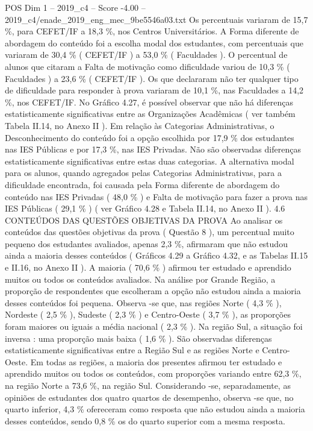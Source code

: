 \begin{textsample}{POS Dim 1 – 2019\_c4 – Score -4.00 – 2019\_c4/enade\_2019\_eng\_mec\_9be5546a03.txt}
Os percentuais variaram de 15,7 \%, para CEFET/IF a 18,3 \%, nos Centros Universitários.
A Forma diferente de abordagem do conteúdo foi a escolha modal dos estudantes, com percentuais que variaram de 30,4 \% ( CEFET/IF ) a 53,0 \% ( Faculdades ).
O percentual de alunos que citaram a Falta de motivação como dificuldade variou de 10,3 \% ( Faculdades ) a 23,6 \% ( CEFET/IF ).
Os que declararam não ter qualquer tipo de dificuldade para responder à prova variaram de 10,1 \%, nas Faculdades a 14,2 \%, nos CEFET/IF.
No Gráfico 4.27, é possível observar que não há diferenças estatisticamente significativas entre as Organizações Acadêmicas ( ver também Tabela II.14, no Anexo II ).
Em relação às Categorias Administrativas, o Desconhecimento do conteúdo foi a opção escolhida por 17,9 \% dos estudantes nas IES Públicas e por 17,3 \%, nas IES Privadas.
Não são observadas diferenças estatisticamente significativas entre estas duas categorias.
A alternativa modal para os alunos, quando agregados pelas Categorias Administrativas, para a dificuldade encontrada, foi causada pela Forma diferente de abordagem do conteúdo nas IES Privadas ( 48,0 \% ) e Falta de motivação para fazer a prova nas IES Públicas ( 29,1 \% ) ( ver Gráfico 4.28 e Tabela II.14, no Anexo II ). 4.6 CONTEÚDOS DAS QUESTÕES OBJETIVAS DA PROVA Ao analisar os conteúdos das questões objetivas da prova ( Questão 8 ), um percentual muito pequeno dos estudantes avaliados, apenas 2,3 \%, afirmaram que não estudou ainda a maioria desses conteúdos ( Gráficos 4.29 a Gráfico 4.32, e as Tabelas II.15 e II.16, no Anexo II ).
A maioria ( 70,6 \% ) afirmou ter estudado e aprendido muitos ou todos os conteúdos avaliados.
Na análise por Grande Região, a proporção de respondentes que escolheram a opção não estudou ainda a maioria desses conteúdos foi pequena.
Observa -se que, nas regiões Norte ( 4,3 \% ), Nordeste ( 2,5 \% ), Sudeste ( 2,3 \% ) e Centro-Oeste ( 3,7 \% ), as proporções foram maiores ou iguais a média nacional ( 2,3 \% ).
Na região Sul, a situação foi inversa : uma proporção mais baixa ( 1,6 \% ).
São observadas diferenças estatisticamente significativas entre a Região Sul e as regiões Norte e Centro-Oeste.
Em todas as regiões, a maioria dos presentes afirmou ter estudado e aprendido muitos ou todos os conteúdos, com proporções variando entre 62,3 \%, na região Norte a 73,6 \%, na região Sul.
Considerando -se, separadamente, as opiniões de estudantes dos quatro quartos de desempenho, observa -se que, no quarto inferior, 4,3 \% ofereceram como resposta que não estudou ainda a maioria desses conteúdos, sendo 0,8 \% os do quarto superior com a mesma resposta.

\end{textsample}
